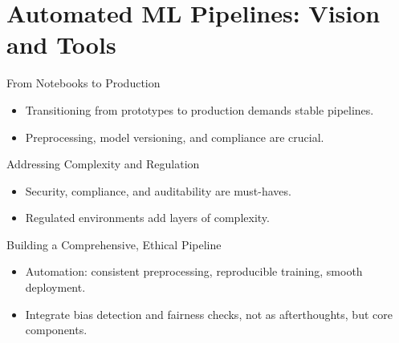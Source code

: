 \documentclass[aspectratio=169]{beamer}
\begin{document}
\section{Automated ML Pipelines: Vision and Tools}

\begin{frame}{From Notebooks to Production}
\begin{itemize}
\item Transitioning from prototypes to production demands stable pipelines.
\item Preprocessing, model versioning, and compliance are crucial.
\end{itemize}
\end{frame}

\begin{frame}{Addressing Complexity and Regulation}
\begin{itemize}
\item Security, compliance, and auditability are must-haves.
\item Regulated environments add layers of complexity.
\end{itemize}
\end{frame}

\begin{frame}{Building a Comprehensive, Ethical Pipeline}
\begin{itemize}
\item Automation: consistent preprocessing, reproducible training, smooth deployment.
\item Integrate bias detection and fairness checks, not as afterthoughts, but core components.
\end{itemize}
\end{frame}
\end{document}
